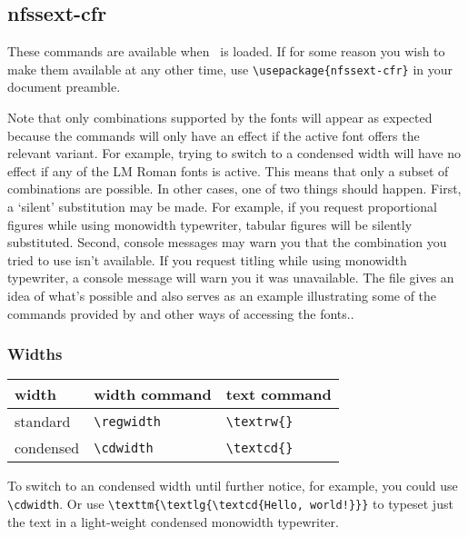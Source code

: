 \documentclass[11pt,british,a4paper]{article}
\begin{document}
\subsection{nfssext-cfr}

These commands are available when \ is loaded. If for some reason you wish to make them available at any other time, use \verb|\usepackage{nfssext-cfr}| in your document preamble.

Note that only combinations supported by the fonts will appear as expected because the commands will only have an effect if the active font offers the relevant variant. For example, trying to switch to a condensed width will have no effect if any of the LM Roman fonts is active. This means that only a subset of combinations are possible. In other cases,	one of two things should happen. First, a ‘silent’ substitution may be made. For example, if you request proportional figures while using monowidth typewriter, tabular figures will be silently substituted. Second, console messages may warn you that the combination you tried to use isn't available.  If you request titling while using monowidth 	typewriter, a console message will warn you it was unavailable.  The file  gives an idea of what's possible and also serves as an example illustrating some of the commands provided by  and other ways of accessing the fonts..

\subsubsection{Widths}

	\begin{longtable}{lll}
		\toprule
		\textbf{width}	&	\textbf{width command}	&	\textbf{text command}\\\midrule\endhead
		\bottomrule\endfoot
		standard				&	\verb|\regwidth|					&	\verb|\textrw{}|\\
		condensed				&	\verb|\cdwidth|					&	\verb|\textcd{}|\\
	\end{longtable}

To switch to an condensed width until further notice, for example, you could use \verb|\cdwidth|. Or use \verb|\texttm{\textlg{\textcd{Hello, world!}}}| to typeset just the text  in a light-weight condensed monowidth typewriter.
\end{document}
